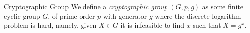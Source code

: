 \begin{definitiontoc}{Cryptographic Group}
    We define a \emph{cryptographic group} $(G, p, g)$ as some finite cyclic group $G$, of prime order $p$ with generator $g$ where the discrete logarithm problem is hard, namely, given $X \in G$ it is infeasible to find $x$ such that $X = g^x$.
\end{definitiontoc}


%
%
%
%
%

